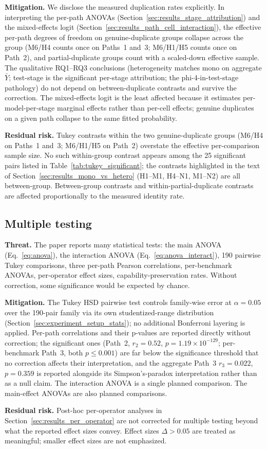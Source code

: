 \textbf{Mitigation.} We disclose the measured duplication rates
explicitly. In interpreting the per-path ANOVAs
(Section~\ref{sec:results_stage_attribution}) and the mixed-effects
logit (Section~\ref{sec:results_path_cell_interaction}), the effective
per-path degrees of freedom on genuine-duplicate groups collapse across
the group (M6/H4 counts once on Paths~1 and~3; M6/H1/H5 counts once on
Path~2), and partial-duplicate groups count with a scaled-down
effective sample. The qualitative RQ1--RQ3 conclusions (heterogeneity
matches mono on aggregate $\bar{Y}$; test-stage is the significant
per-stage attribution; the phi-4-in-test-stage pathology) do not depend
on between-duplicate contrasts and survive the correction. The
mixed-effects logit is the least affected because it estimates
per-model-per-stage marginal effects rather than per-cell effects;
genuine duplicates on a given path collapse to the same fitted
probability.

\textbf{Residual risk.} Tukey contrasts within the two genuine-duplicate
groups (M6/H4 on Paths~1 and~3; M6/H1/H5 on Path~2) overstate the
effective per-comparison sample size. No such within-group contrast
appears among the 25 significant pairs listed in
Table~\ref{tab:tukey_significant}; the contrasts highlighted in the
text of Section~\ref{sec:results_mono_vs_hetero} (H1--M1, H4--N1,
M1--N2) are all between-group. Between-group contrasts and
within-partial-duplicate contrasts are affected proportionally to the
measured identity rate.

\subsection{Multiple testing}
\label{sec:appendix_multiple_testing}

\textbf{Threat.} The paper reports many statistical tests: the main
ANOVA (Eq.~\ref{eq:anova}), the interaction ANOVA
(Eq.~\ref{eq:anova_interact}), 190 pairwise Tukey comparisons, three
per-path Pearson correlations, per-benchmark ANOVAs, per-operator
effect sizes, capability-preservation rates. Without correction, some
significance would be expected by chance.

\textbf{Mitigation.} The Tukey HSD pairwise test controls family-wise
error at $\alpha = 0.05$ over the 190-pair family via its own
studentized-range distribution (Section~\ref{sec:experiment_setup_stats});
no additional Bonferroni layering is applied. Per-path correlations and
their p-values are reported directly without correction; the significant
ones (Path~2, $r_2 = 0.52$, $p = 1.19 \times 10^{-129}$; per-benchmark
Path~3, both $p \leq 0.001$) are far below the significance threshold
that no correction affects their interpretation, and the aggregate
Path~3 $r_3 = 0.022$, $p = 0.359$ is reported alongside its
Simpson's-paradox interpretation rather than as a null claim. The
interaction ANOVA is a single planned comparison. The main-effect
ANOVAs are also planned comparisons.

\textbf{Residual risk.} Post-hoc per-operator analyses in
Section~\ref{sec:results_per_operator} are not corrected for multiple
testing beyond what the reported effect sizes convey. Effect sizes
$\Delta > 0.05$ are treated as meaningful; smaller effect sizes are
not emphasized.

